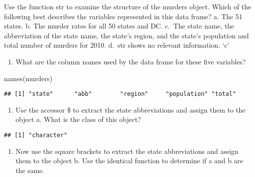 \documentclass[
]{article}
\newenvironment{Shaded}{\begin{snugshade}}{\end{snugshade}}
\newcommand{\FunctionTok}[1]{\textcolor[rgb]{0.00,0.00,0.00}{#1}}
\newcommand{\NormalTok}[1]{#1}
\newcommand{\OtherTok}[1]{\textcolor[rgb]{0.56,0.35,0.01}{#1}}
\newcommand{\SpecialCharTok}[1]{\textcolor[rgb]{0.00,0.00,0.00}{#1}}
\providecommand{\tightlist}{%
  \setlength{\itemsep}{0pt}\setlength{\parskip}{0pt}}
\begin{document}
Use the function str to examine the structure of the murders object.
Which of the following best describes the variables represented in this
data frame? a. The 51 states. b. The murder rates for all 50 states and
DC. c.~The state name, the abbreviation of the state name, the state's
region, and the state's population and total number of murders for 2010.
d.~str shows no relevant information. `c'

\begin{enumerate}
\def\labelenumi{\arabic{enumi}.}
\setcounter{enumi}{1}
\tightlist
\item
  What are the column names used by the data frame for these five
  variables?
\end{enumerate}

\begin{Shaded}
\begin{Highlighting}[]
\FunctionTok{names}\NormalTok{(murders)}
\end{Highlighting}
\end{Shaded}

\begin{verbatim}
## [1] "state"      "abb"        "region"     "population" "total"
\end{verbatim}

\begin{enumerate}
\def\labelenumi{\arabic{enumi}.}
\setcounter{enumi}{2}
\tightlist
\item
  Use the accessor \$ to extract the state abbreviations and assign them
  to the object a. What is the class of this object?
\end{enumerate}

\begin{Shaded}
\end{Shaded}

\begin{verbatim}
## [1] "character"
\end{verbatim}

\begin{enumerate}
\def\labelenumi{\arabic{enumi}.}
\setcounter{enumi}{3}
\tightlist
\item
  Now use the square brackets to extract the state abbreviations and
  assign them to the object b. Use the identical function to determine
  if a and b are the same.
\end{enumerate}
\end{document}
